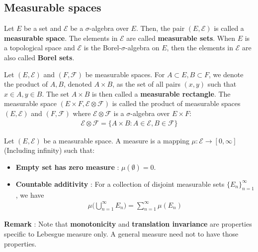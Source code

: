 \subsection{Measurable spaces}
\begin{definition}
    Let $E$ be a set and $\mathcal{E}$ be a $\sigma$-algebra over $E$. Then, the pair $(E, \mathcal{E})$ is called a \textbf{measurable space}. The elements in $\mathcal{E}$ are called \textbf{measurable sets}. When $E$ is a topological space and $\mathcal{E}$ is the Borel-$\sigma$-algebra on $E$, then the elements in $\mathcal{E}$ are also called \textbf{Borel sets}.
\end{definition}

\begin{definition}
    Let $(E, \mathcal{E})$ and $(F, \mathcal{F})$ be measurable spaces. For $A\subset E, B\subset F$, we denote the product of $A, B$, denoted $A\times B$, as the set of all pairs $(x, y)$ such that $x \in A, y\in B$. The set $A\times B$ is then called a \textbf{measurable rectangle}. The measurable space $(E\times F, \mathcal{E} \otimes \mathcal{F})$ is called the product of measurable spaces $(E, \mathcal{E})$ and $(F, \mathcal{F})$ where $\mathcal{E} \otimes \mathcal{F}$ is a $\sigma$-algebra over $E\times F$:
    \begin{align*}
        \mathcal{E} \otimes \mathcal{F} = \Big\{ A \times B: A \in \mathcal{E}, B \in \mathcal{F} \Big\}
    \end{align*}
\end{definition}

\begin{definition}
    Let $(E, \mathcal{E})$ be a measurable space. A measure is a mapping $\mu:\mathcal{E}\to[0, \infty]$ (Including infinity) such that:
    \begin{itemize}
        \item \textbf{Empty set has zero measure} : $\mu(\emptyset) = 0$.
        \item \textbf{Countable additivity} : For a collection of disjoint measurable sets $\{E_n\}_{n=1}^\infty$, we have
        \begin{align*}
            \mu\Bigg( \bigcup_{n=1}^\infty E_n \Bigg) = \sum_{n=1}^\infty \mu(E_n)
        \end{align*}
    \end{itemize}
\end{definition}

\noindent\newline \textbf{Remark} : Note that \textbf{monotonicity} and \textbf{translation invariance} are properties specific to Lebesgue measure only. A general measure need not to have those properties.  


